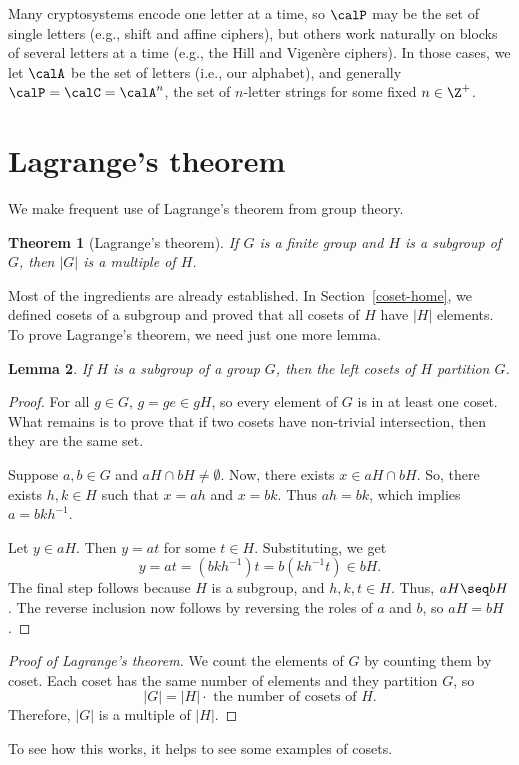 \documentclass[12pt]{amsart}
\theoremstyle{plain}
\newtheorem{thm}{Theorem}[section]
\newtheorem{lemma}[thm]{Lemma}
\theoremstyle{definition}
\theoremstyle{remark}
\begin{document}
Many cryptosystems encode one letter at a time, so $\calP$ may be the
set of single letters (e.g., shift and affine ciphers), but others
work naturally on blocks of several letters at a time (e.g., the Hill
and Vigen\`ere ciphers).  In those cases, we let $\calA$ be the set of
letters (i.e., our alphabet), and generally $\calP=\calC=\calA^n$, the
set of $n$-letter strings for some fixed $n\in\Z^+$.

\section{Lagrange's theorem}
We make frequent use of Lagrange's theorem from group theory.
\begin{thm}[Lagrange's theorem]
  If $G$ is a finite group and $H$ is a subgroup of $G$, then $|G|$ is
  a multiple of $H$.
\end{thm}
Most of the ingredients are already established.  In
Section~\ref{coset-home}, we defined cosets of a subgroup and proved
that all cosets of $H$ have $|H|$ elements.  To prove Lagrange's
theorem, we need just one more lemma.
\begin{lemma}
  If $H$ is a subgroup of a group $G$, then the left cosets of $H$
  partition $G$.
\end{lemma}
\begin{proof}
  For all $g\in G$, $g=ge\in gH$, so every element of $G$ is in at
  least one coset.  What remains is to prove that if two cosets have
  non-trivial intersection, then they are the same set.

  Suppose $a,b\in G$ and $aH\cap bH\neq \emptyset$.  Now, there exists
  $x\in aH\cap bH$.  
  So, there exists $h,k\in H$
  such that $x=ah$ and $x=bk$.  Thus $ah=bk$, which implies
  $a=bkh^{-1}$.  

  Let $y\in aH$.  Then $y=at$ for some $t\in H$.
  Substituting, we get
  \[ y = at = (bkh^{-1}) t = b(kh^{-1} t)\in bH.\]
  The final step follows because $H$ is a subgroup, and $h,k,t\in H$.
  Thus, $aH\seq bH$.  The reverse inclusion now follows by reversing
  the roles of $a$ and $b$, so $aH=bH$. 
\end{proof}
\begin{proof}[Proof of Lagrange's theorem]
  We count the elements of $G$ by counting them by coset.  Each coset
  has the same number of elements and they partition $G$, so 
  \[ |G| = |H|\cdot \text{ the number of cosets of $H$.}\]
  Therefore, $|G|$ is a multiple of $|H|$.
\end{proof}
To see how this works, it helps to see some examples of cosets.
\end{document}
